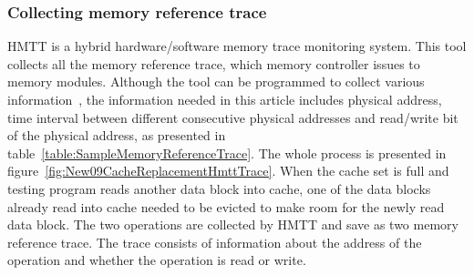 \documentclass[conference]{IEEEtran}
\begin{document}
\subsubsection{Collecting memory reference trace}
HMTT is a hybrid hardware/software memory trace monitoring system. This tool collects all the memory reference trace, which memory controller issues to memory modules. Although the tool can be programmed to collect various information~\cite{chen2014cmd}, the information needed in this article includes physical address, time interval between different consecutive physical addresses and read/write bit of the physical address, as presented in table~\ref{table:SampleMemoryReferenceTrace}. The whole process is presented in figure~\ref{fig:New09CacheReplacementHmttTrace}. When the cache set is full and testing program reads another data block into cache, one of the data blocks already read into cache needed to be evicted to make room for the newly read data block. The two operations are collected by HMTT and save as two memory reference trace. The trace consists of information about the address of the operation and whether the operation is read or write. 
\end{document}
